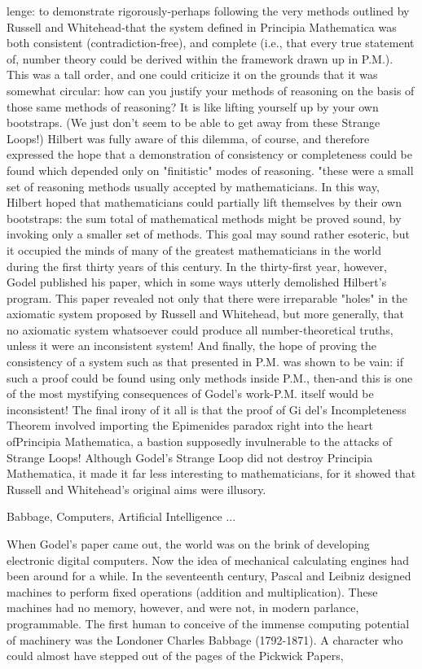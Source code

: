 lenge: to demonstrate rigorously-perhaps following the very methods outlined by Russell and Whitehead-that the system defined in Principia Mathematica was both consistent (contradiction-free), and complete (i.e., that every true statement of, number theory could be derived within the framework drawn up in P.M.). This was a tall order, and one could criticize it on the grounds that it was somewhat circular: how can you justify your methods of reasoning on the basis of those same methods of reasoning? It is like lifting yourself up by your own bootstraps. (We just don't seem to be able to get away from these Strange Loops!) Hilbert was fully aware of this dilemma, of course, and therefore expressed the hope that a demonstration of consistency or completeness could be found which depended only on "finitistic" modes of reasoning. "these were a small set of reasoning methods usually accepted by mathematicians. In this way, Hilbert hoped that mathematicians could partially lift themselves by their own bootstraps: the sum total of mathematical methods might be proved sound, by invoking only a smaller set of methods. This goal may sound rather esoteric, but it occupied the minds of many of the greatest mathematicians in the world during the first thirty years of this century. In the thirty-first year, however, Godel published his paper, which in some ways utterly demolished Hilbert's program. This paper revealed not only that there were irreparable "holes" in the axiomatic system proposed by Russell and Whitehead, but more generally, that no axiomatic system whatsoever could produce all number-theoretical truths, unless it were an inconsistent system! And finally, the hope of proving the consistency of a system such as that presented in P.M. was shown to be vain: if such a proof could be found using only methods inside P.M., then-and this is one of the most mystifying consequences of Godel's work-P.M. itself would be inconsistent! The final irony of it all is that the proof of Gi del's Incompleteness Theorem involved importing the Epimenides paradox right into the heart ofPrincipia Mathematica, a bastion supposedly invulnerable to the attacks of Strange Loops! Although Godel's Strange Loop did not destroy Principia Mathematica, it made it far less interesting to mathematicians, for it showed that Russell and Whitehead's original aims were illusory. 

Babbage, Computers, Artificial Intelligence ... 

When Godel's paper came out, the world was on the brink of developing electronic digital computers. Now the idea of mechanical calculating engines had been around for a while. In the seventeenth century, Pascal and Leibniz designed machines to perform fixed operations (addition and multiplication). These machines had no memory, however, and were not, in modern parlance, programmable. The first human to conceive of the immense computing potential of machinery was the Londoner Charles Babbage (1792-1871). A character who could almost have stepped out of the pages of the Pickwick Papers, 







